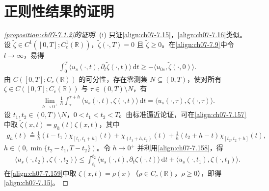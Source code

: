 \documentclass[../../main.tex]{subfiles}%
\begin{document}
\section{正则性结果的证明}\label{section:ch07-正则证明}

\begin{proof}[\cref{proposition:ch07-7.1.2}的证明]
(i) 只证\eqref{align:ch07-7.15}，\eqref{align:ch07-7.16}类似。设 $\widetilde\zeta\in C^1([0,T];C^1_c(\mathbb{R}))$，$\widetilde\zeta(\cdot,T)=0$ 且 $\widetilde\zeta\geqslant0$。在\eqref{align:ch07-7.9}中令 $l\to\infty$，易得
\begin{align}
\int_0^T\langle u_s(\cdot,t),\partial_t\widetilde\zeta(\cdot,t)\rangle\,\mathrm{d}t\geqslant-\langle u_{0s},\widetilde\zeta(\cdot,0)\rangle. \label{align:ch07-7.157}
\end{align}
由 $C([0,T];C_c(\mathbb{R}))$ 的可分性，存在零测集 $N\subseteq(0,T)$，使对所有 $\zeta\in C([0,T];C_c(\mathbb{R}))$ 与 $\tau\in(0,T)\setminus N$，有
\begin{align}
\lim_{h\to0^+}\frac1h\int_\tau^{\tau+h}\langle u_s(\cdot,t),\zeta(\cdot,t)\rangle\,\mathrm{d}t
=\langle u_s(\cdot,\tau),\zeta(\cdot,\tau)\rangle. \label{align:ch07-7.158}
\end{align}
设 $t_1,t_2\in(0,T)\setminus N$，$0<t_1<t_2<T$。由标准逼近论证，可在\eqref{align:ch07-7.157}中取 $\widetilde\zeta(x,t)=g_h(t)\zeta(x,t)$，其中
\begin{align*}
g_h(t)\triangleq \frac1h(t-t_1)\chi_{[t_1,t_1+h]}(t)+\chi_{(t_1+h,t_2)}(t)+\frac1h(t_2+h-t)\chi_{[t_2,t_2+h]}(t),
\end{align*}
$h\in(0,\min\{t_2-t_1,T-t_2\})$。令 $h\to0^+$ 并利用\eqref{align:ch07-7.158}，得
\begin{align}
\langle u_s(\cdot,t_2),\zeta(\cdot,t_2)\rangle
\leqslant\int_{t_1}^{t_2}\langle u_s(\cdot,t),\partial_t\zeta(\cdot,t)\rangle\,\mathrm{d}t
+\langle u_s(\cdot,t_1),\zeta(\cdot,t_1)\rangle. \label{align:ch07-7.159}
\end{align}
在\eqref{align:ch07-7.159}中取 $\zeta(x,t)=\rho(x)$（$\rho\in C_c(\mathbb{R})$，$\rho\geqslant0$），即得\eqref{align:ch07-7.15}。


\end{proof}
\end{document}
